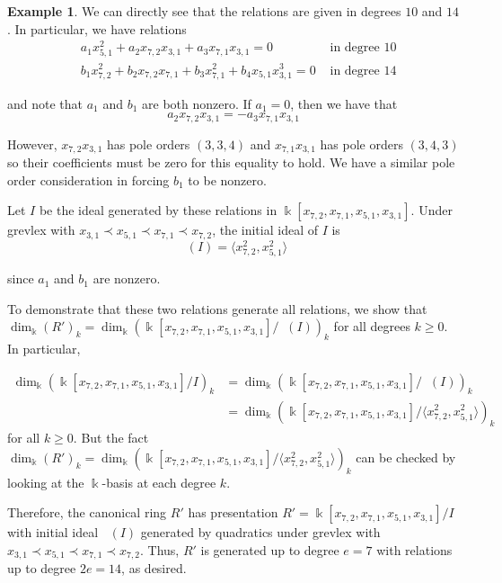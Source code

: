 \documentclass{amsart}
\theoremstyle{plain}
\theoremstyle{definition}
\newtheorem{example}[thm]{Example}
\theoremstyle{remark}
\numberwithin{equation}{section}
\newcommand\Bk{{\Bbbk}}
\DeclareMathOperator{\initial}{in_\prec}
\begin{document}
\begin{example}

We can directly see that the relations are given in degrees $10$
and $14$. In particular, we have relations
\begin{align*}
	&a_1 x_{5, 1}^2 + a_2 x_{7, 2} x_{3, 1} + a_3 x_{7, 1} x_{3, 1} = 
	0 &\text{ in degree $10$} \\
	&b_1 x_{7, 2}^2 + b_2 x_{7, 2} x_{7, 1} + b_3 x_{7, 1}^2
	+ b_4 x_{5, 1} x_{3, 1}^3 = 0  &\text{ in degree $14$}
\end{align*}

\noindent
and note that $a_1$ and $b_1$ are both nonzero. If $a_1 = 0$, then we
have that
\[
	a_2 x_{7, 2} x_{3, 1} = -a_3 x_{7, 1} x_{3, 1}
\]

\noindent
However, $x_{7, 2} x_{3, 1}$ has pole orders $(3, 3, 4)$ and
$x_{7, 1} x_{3, 1}$ has pole orders $(3, 4, 3)$ so their
coefficients must be zero for this equality to hold. We have a
similar pole order consideration in forcing $b_1$ to be nonzero.

Let $I$ be the ideal generated by these relations in
$\Bk[x_{7, 2}, x_{7, 1}, x_{5, 1}, x_{3, 1}]$. Under grevlex with
$x_{3,1} \prec x_{5,1} \prec x_{7,1} \prec x_{7,2}$, the initial
ideal of $I$ is
\[
	\initial(I) = \langle x_{7, 2}^2, x_{5, 1}^2 \rangle
\]

\noindent
since $a_1$ and $b_1$ are nonzero.

To demonstrate that these two relations generate all 
relations, we show that $\dim_\Bk (R')_k = \dim_\Bk
(\Bk[x_{7, 2}, x_{7, 1}, x_{5, 1}, x_{3, 1}] / \initial(I))_k$ for 
all degrees $k \geq 0$. In particular, 

\begin{align*}
	\dim_\Bk \left(\Bk[x_{7, 2}, x_{7, 1}, x_{5, 1}, x_{3, 1}] / I\right)_k &=
	\dim_\Bk \left(\Bk[x_{7, 2}, x_{7, 1}, x_{5, 1}, x_{3, 1}]	/ \initial(I)\right)_k \\
	&= \dim_\Bk \left(\Bk[x_{7, 2}, x_{7, 1}, x_{5, 1}, x_{3, 1}] / \langle
	x_{7, 2}^2, x_{5, 1}^2 \rangle \right)_k
\end{align*}
\noindent
for all $k \geq 0$. But the fact $\dim_\Bk (R')_k = \dim_\Bk \left(\Bk[x_{7, 2},
x_{7, 1}, x_{5, 1}, x_{3, 1}] / \langle x_{7, 2}^2, x_{5, 1}^2
\rangle\right)_k$ can be checked by looking at the $\Bk$-basis at each degree
$k$.

Therefore, the canonical ring $R'$ has presentation $R' =
\Bk[x_{7, 2}, x_{7, 1}, x_{5, 1}, x_{3, 1}] / I$ with
initial ideal $\initial(I)$ generated by quadratics under grevlex
with $x_{3,1} \prec x_{5,1} \prec x_{7,1} \prec x_{7,2}$.
Thus, $R'$ is generated up to degree $e = 7$ with relations up to
degree $2e = 14$, as desired.

\end{example}
\end{document}
